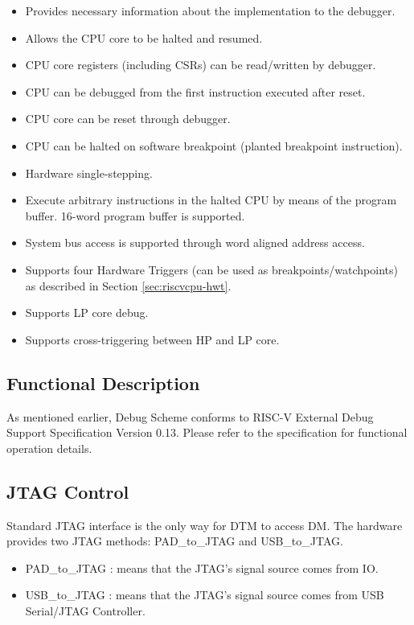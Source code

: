 \documentclass[main\_\_EN.tex]{subfiles}
\begin{document}
\begin{itemize}
    \item {Provides necessary information about the implementation to the debugger.}
    \item {Allows the CPU core to be halted and resumed.}
    \item {CPU core registers (including CSRs) can be read/written by debugger.}
    \item {CPU can be debugged from the first instruction executed after reset.}
    \item {CPU core can be reset through debugger.}
    \item {CPU can be halted on software breakpoint (planted breakpoint instruction).}
    \item {Hardware single-stepping.}
    \item {Execute arbitrary instructions in the halted CPU by means of the program buffer. 16-word program buffer is supported.}
    \item {System bus access is supported through word aligned address access.}
    \item {Supports four Hardware Triggers (can be used as breakpoints/watchpoints) as described in Section \ref{sec:riscvcpu-hwt}.}
    \item {Supports LP core debug.}
    \item {Supports cross-triggering between HP and LP core.}
\end{itemize}

\subsection{Functional Description}
\label{sec:riscvcpu-dbg-func-descr}

As mentioned earlier, Debug Scheme conforms to RISC-V External Debug Support Specification Version 0.13. Please refer to the specification for functional operation details.

\subsection{JTAG Control}
\label{sec:riscvcpu-dbg-jtag-cntl}

Standard JTAG interface is the only way for DTM to access DM. The hardware provides two JTAG methods: PAD\_to\_JTAG and USB\_to\_JTAG.

\begin{itemize}
    \item {PAD\_to\_JTAG : means that the JTAG's signal source comes from IO.}
    \item {USB\_to\_JTAG : means that the JTAG's signal source comes from USB Serial/JTAG Controller.}
\end{itemize}
\end{document}
